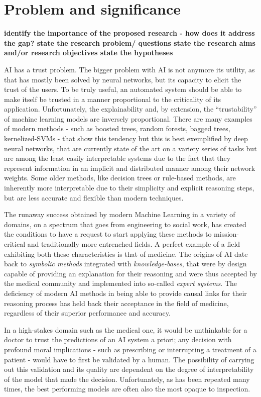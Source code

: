 \documentclass[mscthesis]{usiinfthesis}
\begin{document}
 
\section{Problem and significance}
\textbf{identify the importance of the proposed research - how does it address the gap? state the research problem/ questions state the research aims and/or research objectives state the hypotheses
}

AI has a trust problem.  The bigger problem with AI is not anymore its utility, as that has mostly been solved by neural networks, but its capacity to elicit the trust of the users.
To be truly useful, an automated system should be able to make itself be trusted in a manner proportional to the criticality of its application.  Unfortunately, the explainability and, by extension, the ``trustability'' of machine learning models are inversely proportional.  There are many examples of modern methods - such as boosted trees, random forests, bagged trees, kernelized-SVMs - that show this tendency but this is best exemplified by deep neural networks, that are currently state of the art on a variety series of tasks but are among the least easily interpretable systems due to the fact that they represent information in an implicit and distributed manner among their network weights.  Some older methods, like decision trees or rule-based methods, are inherently more interpretable due to their simplicity and explicit reasoning steps, but are less accurate and flexible than modern techniques. 

The runaway success obtained by modern Machine Learning in a variety of domains, on a spectrum that goes from engineering to social work, has created the conditions to have a request to start applying these methods to mission-critical and traditionally more entrenched fields.  A perfect example of a field exhibiting both these characteristics is that of medicine.  The origins of AI date back to \textit{symbolic methods} integrated with \textit{knowledge-bases}, that were by design capable of providing an explanation for their reasoning and were thus accepted by the medical community and implemented into so-called \textit{expert systems}.  The deficiency of modern AI methods in being able to provide causal links for their reasoning process has held back their acceptance in the field of medicine, regardless of their superior performance and accuracy.

In a high-stakes domain such as the medical one, it would be unthinkable for a doctor to trust the predictions of an AI system a priori; any decision with profound moral implications - such as prescribing or interrupting a treatment of a patient - would have to first be validated by a human.  The possibility of carrying out this validation and its quality are dependent on the degree of interpretability of the model that made the decision.  Unfortunately, as has been repeated many times, the best performing models are often also the most opaque to inspection.
\end{document}
